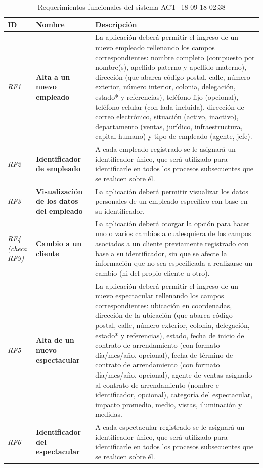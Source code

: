 \documentclass[12pt]{article}
\begin{document}
{\small
\begin{longtable}[H]{m{2cm}m{4cm}m{6cm}}
    \caption{\normalsize{Requerimientos funcionales del sistema ACT- 18-09-18 02:38}}\\
    
    \toprule
    
    \centering \textbf{ID} & \centering  \textbf{Nombre} & \centering \small \textbf{Descripción} \tabularnewline
    \midrule
    \textit{RF1} & \textbf{Alta a un nuevo empleado} & La aplicación deberá permitir el ingreso de un nuevo empleado rellenando los campos correspondientes: nombre completo (compuesto por nombre(s), apellido paterno y apellido materno), dirección (que abarca código postal, calle, número exterior, número interior, colonia, delegación, estado* y referencias), teléfono fijo (opcional), teléfono celular (con lada incluida), dirección de correo electrónico, situación (activo, inactivo), departamento (ventas, jurídico, infraestructura, capital humano) y tipo de empleado (agente, jefe).\tabularnewline
     \textit{RF2} & \textbf{Identificador de empleado} & A cada empleado registrado se le asignará un identificador único, que será utilizado para identificarle en todos los procesos subsecuentes que se realicen sobre él.\tabularnewline
     \textit{RF3} & \textbf{Visualización de los datos del empleado} & La aplicación deberá permitir visualizar los datos personales de un empleado específico con base en su identificador.\tabularnewline
     \textit{RF4 (checa RF9)} & \textbf{Cambio a un cliente} & La aplicación deberá otorgar la opción para hacer uno o varios cambios a cualesquiera de los campos asociados a un cliente previamente registrado con base a su identificador, sin que se afecte la información que no sea especificada a realizarse un cambio (ni del propio cliente u otro).\tabularnewline
    \textit{RF5} & \textbf{Alta de un nuevo espectacular} & La aplicación deberá permitir el ingreso de un nuevo espectacular rellenando los campos correspondientes: ubicación en coordenadas, dirección de la ubicación (que abarca código postal, calle, número exterior, colonia, delegación, estado* y referencias), estado, fecha de inicio de contrato de arrendamiento (con formato día/mes/año, opcional), fecha de término de contrato de arrendamiento (con formato día/mes/año, opcional), agente de ventas asignado al contrato de arrendamiento (nombre e identificador, opcional), categoría del espectacular, impacto promedio, medio, vistas, iluminación y medidas.\tabularnewline
    \textit{RF6} & \textbf{Identificador del espectacular} & A cada espectacular registrado se le asignará un identificador único, que será utilizado para identificarle en todos los procesos subsecuentes que se realicen sobre él. \tabularnewline

\end{longtable}}
\end{document}
